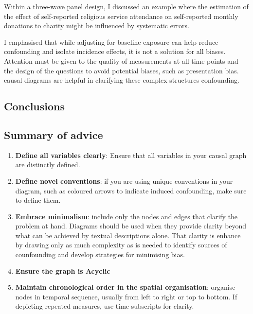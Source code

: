 \documentclass[
  singlecolumn]{report}
\begin{document}
Within a three-wave panel design, I discussed an example where the
estimation of the effect of self-reported religious service attendance
on self-reported monthly donations to charity might be influenced by
systematic errors.

I emphasised that while adjusting for baseline exposure can help reduce
confounding and isolate incidence effects, it is not a solution for all
biases. Attention must be given to the quality of measurements at all
time points and the design of the questions to avoid potential biases,
such as presentation bias. causal diagrams are helpful in clarifying
these complex structures confounding.

\hypertarget{conclusions}{%
\subsection{Conclusions}\label{conclusions}}

\hypertarget{summary-of-advice}{%
\subsection{Summary of advice}\label{summary-of-advice}}

\begin{enumerate}
\def\labelenumi{\arabic{enumi}.}
\item
  \textbf{Define all variables clearly}: Ensure that all variables in
  your causal graph are distinctly defined.
\item
  \textbf{Define novel conventions}: if you are using unique conventions
  in your diagram, such as coloured arrows to indicate induced
  confounding, make sure to define them.
\item
  \textbf{Embrace minimalism}: include only the nodes and edges that
  clarify the problem at hand. Diagrams should be used when they provide
  clarity beyond what can be achieved by textual descriptions alone.
  That clarity is enhance by drawing only as much complexity as is
  needed to identify sources of counfounding and develop strategies for
  minimising bias.
\item
  \textbf{Ensure the graph is Acyclic}
\item
  \textbf{Maintain chronological order in the spatial organisation}:
  organise nodes in temporal sequence, usually from left to right or top
  to bottom. If depicting repeated measures, use time subscripts for
  clarity.
\end{enumerate}
\end{document}
